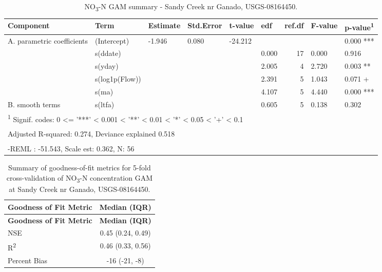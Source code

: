 \documentclass[
]{article}
\newenvironment{widestuff}{\begin{table}[h]\begin{adjustwidth}{-4.5cm}{-4.5cm}\centering}{\end{adjustwidth}\end{table}}
\begin{document}
\begin{widestuff}

\caption{NO\textsubscript{3}-N GAM summary - Sandy Creek nr Ganado, USGS-08164450.}
\centering
\begin{tabular}[t]{llllllrll}
\toprule
Component & Term & Estimate & Std.Error & t-value & edf & ref.df & F-value & p-value\textsuperscript{1}\\
\midrule
A. parametric coefficients & (Intercept) & -1.946 & 0.080 & -24.212 &  &  &  & 0.000 ***\\
\cmidrule{1-9}
 & s(ddate) &  &  &  & 0.000 & 17 & 0.000 & 0.916\\

 & s(yday) &  &  &  & 2.005 & 4 & 2.720 & 0.003 **\\

 & s(log1p(Flow)) &  &  &  & 2.391 & 5 & 1.043 & 0.071 +\\

 & s(ma) &  &  &  & 4.107 & 5 & 4.440 & 0.000 ***\\

\multirow[t]{-5}{*}{\raggedright\arraybackslash B. smooth terms} & s(ltfa) &  &  &  & 0.605 & 5 & 0.138 & 0.302\\
\bottomrule
\multicolumn{9}{l}{\textsuperscript{1} Signif. codes: 0 <= '***' < 0.001 < '**' < 0.01 < '*' < 0.05 < '+' < 0.1}\\
\multicolumn{9}{l}{\textsuperscript{} Adjusted R-squared: 0.274, Deviance explained 0.518}\\
\multicolumn{9}{l}{\textsuperscript{} -REML : -51.543, Scale est: 0.362, N: 56}\\
\end{tabular}
\end{widestuff}

\hypertarget{tbl-NO308164450-CV}{}
\begin{longtable}[]{@{}lc@{}}
\caption{\label{tbl-NO308164450-CV}Summary of goodness-of-fit metrics
for 5-fold cross-validation of NO\textsubscript{3}-N concentration GAM
at Sandy Creek nr Ganado, USGS-08164450.}\tabularnewline
\toprule()
\textbf{Goodness of Fit Metric} & \textbf{Median (IQR)} \\
\midrule()
\endfirsthead
\toprule()
\textbf{Goodness of Fit Metric} & \textbf{Median (IQR)} \\
\midrule()
\endhead
NSE & 0.45 (0.24, 0.49) \\
R\textsuperscript{2} & 0.46 (0.33, 0.56) \\
Percent Bias & -16 (-21, -8) \\
\bottomrule()
\end{longtable}
\end{document}

